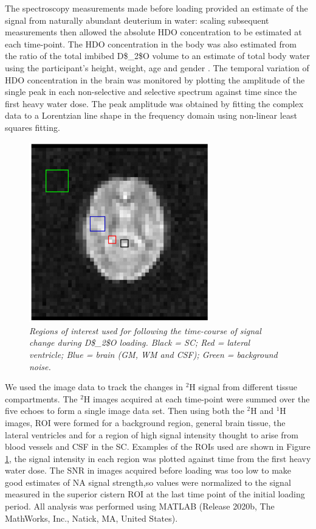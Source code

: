 The spectroscopy measurements made before loading provided an estimate of the signal from naturally abundant deuterium in water: scaling subsequent measurements then allowed the absolute \ac{HDO} concentration to be estimated at each time-point. The \ac{HDO} concentration in the body was also estimated from the ratio of the total imbibed \ac{D$_2$O} volume to an estimate of total body water using the participant’s height, weight, age and gender \cite{Watson1980TotalMeasurements}. The temporal variation of HDO concentration in the brain was monitored by plotting the amplitude of the single peak in each non-selective and selective spectrum against time since the first heavy water dose. The peak amplitude was obtained by fitting the complex data to a Lorentzian line shape in the frequency domain using non-linear least squares fitting. 

\begin{figure}[H]
    \centering
    \includegraphics[width=0.7\textwidth]{Figures/D2O/ROI.png}
    \caption{\textit{Regions of interest used for following the time-course of signal change during \ac{D$_2$O} loading. Black = \ac{SC}; Red = lateral ventricle; Blue = brain (\ac{GM}, \ac{WM} and \ac{CSF}); Green = background noise.}}
    \label{fig:D2O:ROI}
\end{figure}

We used the image data to track the changes in $^2$H signal from different tissue compartments. The $^2$H images acquired at each time-point were summed over the five echoes to form a single image data set. Then using both the $^2$H and $^1$H images, \ac{ROI} were formed for a background region, general brain tissue, the lateral ventricles and for a region of high signal intensity thought to arise from blood vessels and \ac{CSF} in the \ac{SC}. Examples of the \ac{ROI}s used are shown in Figure \ref{fig:D2O:ROI}, the signal intensity in each region was plotted against time from the first heavy water dose. The \ac{SNR} in images acquired before loading was too low to make good estimates of \ac{NA} signal strength,so values were normalized to the signal measured in the superior cistern \ac{ROI} at the last time point of the initial loading period. All analysis was performed using MATLAB (Release 2020b, The MathWorks, Inc., Natick, MA, United States).

